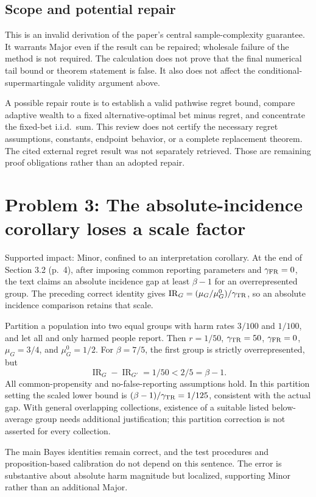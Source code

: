 \documentclass[10pt]{article}
\begin{document}
\subsection*{Scope and potential repair}
This is an invalid derivation of the paper’s central sample-complexity guarantee. It warrants Major even if the result can be repaired; wholesale failure of the method is not required. The calculation does not prove that the final numerical tail bound or theorem statement is false. It also does not affect the conditional-supermartingale validity argument above.\par
A possible repair route is to establish a valid pathwise regret bound, compare adaptive wealth to a fixed alternative-optimal bet minus regret, and concentrate the fixed-bet i.i.d. sum. This review does not certify the necessary regret assumptions, constants, endpoint behavior, or a complete replacement theorem. The cited external regret result was not separately retrieved. Those are remaining proof obligations rather than an adopted repair.\par
\section*{Problem 3: The absolute-incidence corollary loses a scale factor}
Supported impact: Minor, confined to an interpretation corollary. At the end of Section 3.2 (p. 4), after imposing common reporting parameters and \(\gamma_{\rm FR}=0\), the text claims an absolute incidence gap at least \(\beta-1\) for an overrepresented group. The preceding correct identity gives \(\operatorname{IR}_G=(\mu_G/\mu_G^0)/\gamma_{\rm TR}\), so an absolute incidence comparison retains that scale.\par
Partition a population into two equal groups with harm rates \(3/100\) and \(1/100\), and let all and only harmed people report. Then \(r=1/50\), \(\gamma_{\rm TR}=50\), \(\gamma_{\rm FR}=0\), \(\mu_G=3/4\), and \(\mu_G^0=1/2\). For \(\beta=7/5\), the first group is strictly overrepresented, but \[\operatorname{IR}_G-\operatorname{IR}_{G'}=1/50
       <2/5=\beta-1.\] All common-propensity and no-false-reporting assumptions hold. In this partition setting the scaled lower bound is \((\beta-1)/\gamma_{\rm TR}=1/125\), consistent with the actual gap. With general overlapping collections, existence of a suitable listed below-average group needs additional justification; this partition correction is not asserted for every collection.\par
The main Bayes identities remain correct, and the test procedures and proposition-based calibration do not depend on this sentence. The error is substantive about absolute harm magnitude but localized, supporting Minor rather than an additional Major.\par
\end{document}
